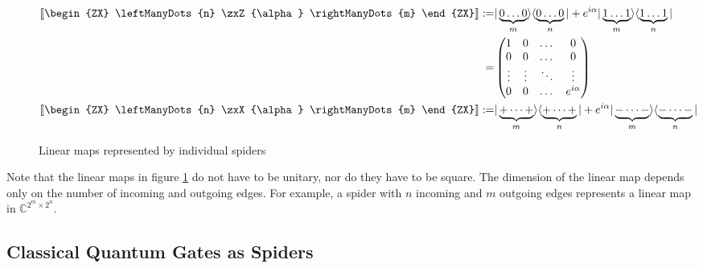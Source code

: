 \begin{figure}
    \begin{align*}
        \left \llbracket
        \begin{ZX}
            \leftManyDots{n}  \zxZ{\alpha} \rightManyDots{m}
        \end{ZX}
        \right \rrbracket
        := & |\underbrace{0\dots 0}_{m}\rangle \langle \underbrace{0\dots0}_{n}| + e^{i\alpha}|\underbrace{1\dots1}_{m}\rangle \langle \underbrace{1\dots1}_{n}|
        \\
        =  & \begin{pmatrix}
                 1      & 0      & \dots  & 0           \\
                 0      & 0      & \dots  & 0           \\
                 \vdots & \vdots & \ddots & \vdots      \\
                 0      & 0      & \dots  & e^{i\alpha} \\
             \end{pmatrix}
        \\
        \left \llbracket
        \begin{ZX}
            \leftManyDots{n}  \zxX{\alpha} \rightManyDots{m}
        \end{ZX}
        \right \rrbracket
        := & |\underbrace{+ \dots +}_{m}\rangle \langle \underbrace{+ \dots +}_{n}| + e^{i\alpha}|\underbrace{- \dots -}_{m}\rangle \langle \underbrace{- \dots -}_{n}|
        \\
    \end{align*}
    \caption{Linear maps represented by individual spiders}
    \label{fig:individual-spiders-linear-maps}
\end{figure}


Note that the linear maps in figure \ref{fig:individual-spiders-linear-maps} do not have to be unitary, nor do they have to be square. The dimension of the linear map depends only on the number of incoming and outgoing edges. For example, a spider with $n$ incoming and $m$ outgoing edges represents a linear map in $\mathbb{C}^{2^m \times 2^n}$.

\subsection{Classical Quantum Gates as Spiders}

